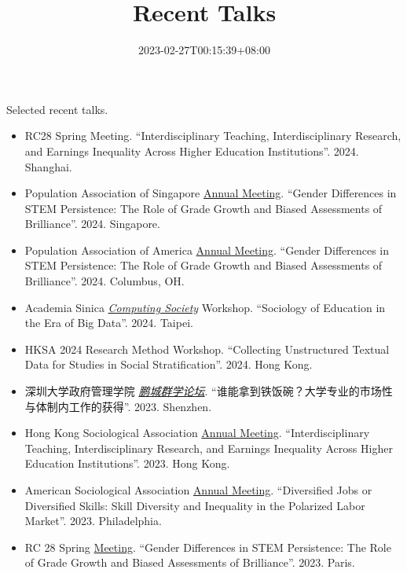 \documentclass[
]{article}
\title{Recent Talks}
\author{}
\date{\vspace{-2.5em}2023-02-27T00:15:39+08:00}
\providecommand{\tightlist}{%
  \setlength{\itemsep}{0pt}\setlength{\parskip}{0pt}}
\begin{document}
\maketitle

Selected recent talks.

\begin{itemize}
\tightlist
\item
  RC28 Spring Meeting. ``Interdisciplinary Teaching, Interdisciplinary
  Research, and Earnings Inequality Across Higher Education
  Institutions''. 2024. Shanghai.\\
\item
  Population Association of Singapore
  \href{https://www.sgpopulation.org/programme-2024}{Annual Meeting}.
  ``Gender Differences in STEM Persistence: The Role of Grade Growth and
  Biased Assessments of Brilliance''. 2024. Singapore.
\item
  Population Association of America
  \href{https://submissions.mirasmart.com/PAA2024/Itinerary/PresentationDetail.aspx?evdid=826}{Annual
  Meeting}. ``Gender Differences in STEM Persistence: The Role of Grade
  Growth and Biased Assessments of Brilliance''. 2024. Columbus, OH.
\item
  Academia Sinica
  \emph{\href{https://www.ios.sinica.edu.tw/msgNoE/20240323-2}{Computing
  Society}} Workshop. ``Sociology of Education in the Era of Big Data''.
  2024. Taipei.
\item
  HKSA 2024 Research Method Workshop. ``Collecting Unstructured Textual
  Data for Studies in Social Stratification''. 2024. Hong Kong.
\item
  深圳大学政府管理学院
  \emph{\href{https://sg.szu.edu.cn/info/1006/1641.htm}{鹏城群学论坛}}.
  ``谁能拿到铁饭碗？大学专业的市场性与体制内工作的获得''. 2023.
  Shenzhen.
\item
  Hong Kong Sociological Association
  \href{https://www.soc.cuhk.edu.hk/conference/hong-kong-sociological-association-24th-annual-conference/}{Annual
  Meeting}. ``Interdisciplinary Teaching, Interdisciplinary Research,
  and Earnings Inequality Across Higher Education Institutions''. 2023.
  Hong Kong.
\item
  American Sociological Association
  \href{https://convention2.allacademic.com/one/asa/asa23/index.php?cmd=Online+Program+View+Session\&selected_session_id=2073361\&PHPSESSID=104ls6dveb8kr5as3o25f2mlp5}{Annual
  Meeting}. ``Diversified Jobs or Diversified Skills: Skill Diversity
  and Inequality in the Polarized Labor Market''. 2023. Philadelphia.
\item
  RC 28 Spring
  \href{https://rc28paris2023.sciencesconf.org/data/pages/2023_05_24_4.pdf}{Meeting}.
  ``Gender Differences in STEM Persistence: The Role of Grade Growth and
  Biased Assessments of Brilliance''. 2023. Paris.
\end{itemize}
\end{document}
